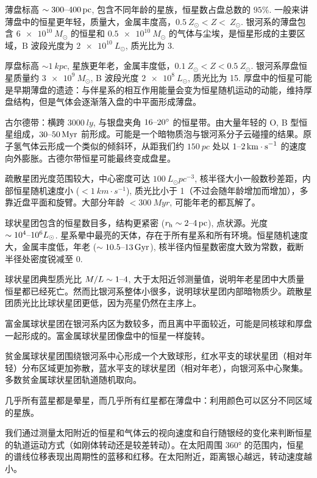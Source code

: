 \documentclass[../天体物理基础.tex]{subfiles}
\begin{document}
薄盘标高 $\sim300\text{\textendash}\qty{400}{pc}$, 包含不同年龄的星族，恒星数占盘总数的 $95\%$. 一般来讲薄盘中的恒星更年轻，质量大，金属丰度高，$\qty{0.5}{Z_{\odot}}<Z<\qty{}{Z_{\odot}}$. 银河系的薄盘包含 $\qty{6e10}{M_{\odot}}$ 的恒星和 $\qty{0.5e10}{M_{\odot}}$ 的气体与尘埃，是恒星形成的主要区域，$\mathrm{B}$ 波段光度为 $\qty{2e10}{L_{\odot}}$, 质光比为 3. 

厚盘标高 $\sim\qty{1}{kpc}$, 星族更年老，金属丰度低，$\qty{0.1}{Z_{\odot}}<Z<\qty{0.5}{Z_{\odot}}$. 银河系厚盘恒星质量约 $\qty{3e9}{M_{\odot}}$, B 波段光度 $\qty{2e8}{L_{\odot}}$, 质光比为 15. 厚盘中的恒星可能是早期薄盘的遗迹：与伴星系的相互作用能量会变为恒星随机运动的动能，维持厚盘结构，但是气体会逐渐落入盘的中平面形成薄盘。

古尔德带：横跨 $\qty{3000}{ly}$, 与银盘夹角 $16\text{\textendash}\ang{20;;}$ 的恒星带。由大量年轻的 O, B 型恒星组成，$30\text{\textendash}\qty{50}{Myr}$ 前形成。可能是一个暗物质泡与银河系分子云碰撞的结果。原子氢气体云形成一个类似的倾斜环，从距我们约 $\qty{150}{pc}$ 处以 $1\text{\textendash}\qty{2}{km\cdot{}s^{-1}}$ 的速度向外膨胀。古德尔带恒星可能最终变成盘星。

疏散星团光度范围较大，中心密度可达 $\qty{100}{L_{\odot}pc^{-3}}$, 核半径大小一般数秒差距，内部恒星随机速度小 ($<\qty{1}{km\cdot{}s^{-1}}$), 质光比小于 1（不过会随年龄增加而增加），多靠近盘平面和旋臂。大部分年龄 $<\qty{300}{Myr}$, 可能年老的都瓦解了。

球状星团包含的恒星数目多，结构更紧密 ($r_{\mathrm{h}}\sim2\text{\textendash}\qty{4}{pc}$), 点状源。光度 $\sim10^{4}\text{\textendash}10^{6}L_{\odot}$. 星系晕中最亮的天体，存在于所有星系和所有环境。恒星随机速度大，金属丰度低，年老 ($\sim10.5\text{\textendash}\qty{13}{Gyr}$), 核半径内恒星数密度大致为常数，截断半径处密度锐减至 0.

球状星团典型质光比 $M/L\sim1\text{\textendash}4$, 大于太阳近邻测量值，说明年老星团中大质量恒星都已经死亡。然而比银河系整体小很多，说明球状星团内部暗物质少。疏散星团质光比比球状星团更低，因为亮星仍然在主序上。

富金属球状星团在银河系内区为数较多，而且离中平面较近，可能是同核球和厚盘一起形成的。富金属球状星团像盘中的恒星一样旋转。

贫金属球状星团围绕银河系中心形成一个大致球形，红水平支的球状星团（相对年轻）分布区域更加弥散，蓝水平支的球状星团（相对年老），向银河系中心聚集。多数贫金属球状星团轨道随机取向。

几乎所有蓝星都是晕星，而几乎所有红星都在薄盘中：利用颜色可以区分不同区域的星族。

我们通过测量太阳附近的恒星和气体云的视向速度和自行随银经的变化来判断恒星的轨道运动方式（如刚体转动还是较差转动）。在太阳周围 $\ang{360;;}$ 的范围内，恒星的谱线位移表现出周期性的蓝移和红移。在太阳附近，距离银心越远，转动速度越小。
\end{document}
